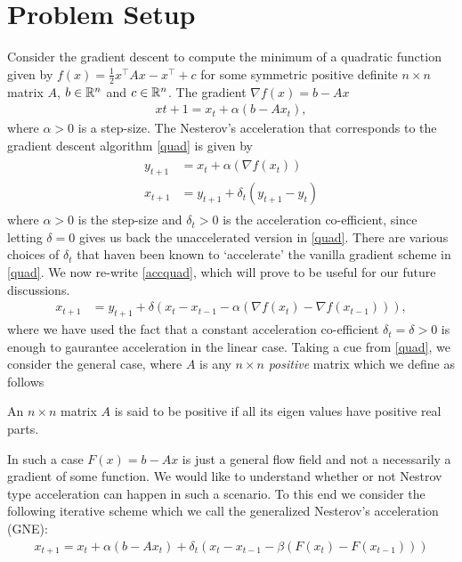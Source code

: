 \section{Problem Setup}
Consider the gradient descent to compute the minimum of a quadratic function given by $f(x)=\frac{1}{2}x^\top A x-x^\top +c$ for some symmetric positive definite $n\times n$ matrix $A$, $b\in \mathbb{R}^n$ and $c\in\mathbb{R}^n$. The gradient $\nabla f(x)=b-Ax$
\begin{align}\label{quad}
x{t+1}=x_t+\alpha (b-Ax_t),
\end{align}
where $\alpha>0$ is a step-size. The Nesterov's acceleration that corresponds to the gradient descent algorithm \eqref{quad} is given by
\begin{align}\label{accquad}
\begin{split}
y_{t+1}&=x_t+\alpha(\nabla f(x_t))\\
x_{t+1}&=y_{t+1}+\delta_t(y_{t+1}-y_{t})
\end{split}
\end{align}
where $\alpha>0$ is the step-size and $\delta_t>0$ is the acceleration co-efficient, since letting $\delta=0$ gives us back the unaccelerated version in \eqref{quad}. There are various choices of $\delta_t$ that haven been known to `accelerate' the vanilla gradient scheme in \eqref{quad}. We now re-write \eqref{accquad}, which will prove to be useful for our future discussions.
\begin{align}\label{accquadrw}
x_{t+1}&=y_{t+1}+\delta(x_{t}-x_{t-1}-\alpha(\nabla f(x_t)-\nabla f(x_{t-1}))),
\end{align}
where we have used the fact that a constant acceleration co-efficient $\delta_t=\delta>0$ is enough to gaurantee acceleration in the linear case.
Taking a cue from \eqref{quad}, we consider the general case, where $A$ is any $n\times n$ \emph{positive} matrix which we define as follows
\begin{definition}\label{pos}
An $n\times n$ matrix $A$ is said to be positive if all its eigen values have positive real parts.
\end{definition}
In such a case $F(x)=b-Ax$ is just a general flow field and not a necessarily a gradient of some function. We would like to understand whether or not Nestrov type acceleration can happen in such a scenario. To this end we consider the following iterative scheme which we call the generalized Nesterov's acceleration (GNE):
\begin{align}\label{accgen}
x_{t+1}=x_t+\alpha(b-Ax_t)+\delta_t (x_t-x_{t-1}-\beta(F(x_t)-F(x_{t-1})) )
\end{align}
